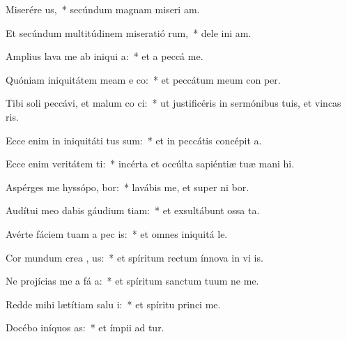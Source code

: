 \item Miserére  us,~* secúndum magnam miseri am.
\item Et secúndum multitúdinem miseratió rum,~* dele ini am.
\item Amplius lava me ab iniqui a:~* et a peccá   me.
\item Quóniam iniquitátem meam e co:~* et peccátum meum con   per.
\item Tibi soli peccávi, et malum co  ci:~* ut justificéris in sermónibus tuis, et vincas  ris.
\item Ecce enim in iniquitáti tus sum:~* et in peccátis concépit   a.
\item Ecce enim veritátem ti:~* incérta et occúlta sapiéntiæ tuæ mani hi.
\item Aspérges me hyssópo,  bor:~* lavábis me, et super ni bor.
\item Audítui meo dabis gáudium  tiam:~* et exsultábunt ossa ta.
\item Avérte fáciem tuam a pec is:~* et omnes iniquitá  le.
\item Cor mundum crea  , us:~* et spíritum rectum ínnova in vi is.
\item Ne projícias me a fá a:~* et spíritum sanctum tuum ne   me.
\item Redde mihi lætítiam salu i:~* et spíritu princi  me.
\item Docébo iníquos  as:~* et ímpii ad  tur.
